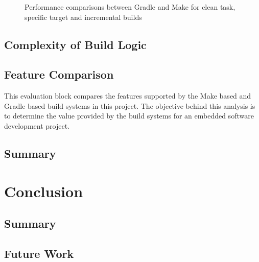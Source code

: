 \documentclass[12pt, a4paper, titlepage]{scrartcl}
\begin{document}
\begin{figure}[!ht]
\centering
{}
\caption{Performance comparisons between Gradle and Make for clean task, specific target and incremental builds}
\label{fig:perf-comparison-clean-spec-incre}
\end{figure}
\subsection{Complexity of Build Logic}
\subsection{Feature Comparison}
\par This evaluation block compares the features supported by the Make based and Gradle based build systems in this project. The objective behind this analysis is to determine the value provided by the build systems for an embedded software development project.
\subsection{Summary}

\section{Conclusion}
\subsection{Summary}
\subsection{Future Work}
\end{document}
